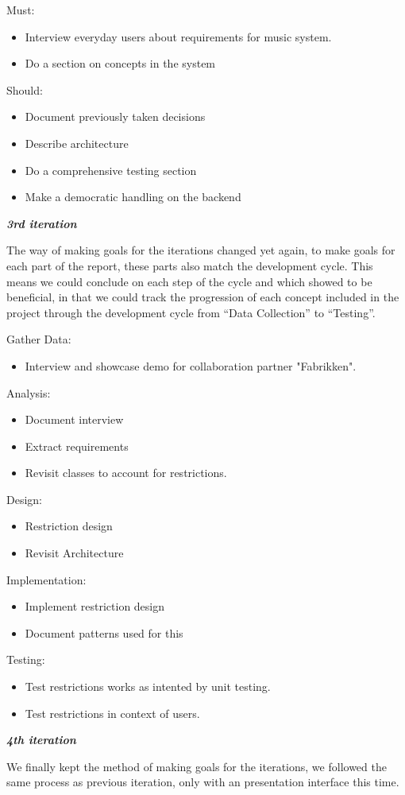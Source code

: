 	Must:
	\begin{itemize}
		\item Interview everyday users about requirements for music system.
		\item Do a section on concepts in the system
	\end{itemize}

	Should:
	\begin{itemize}
		\item Document previously taken decisions
		\item Describe architecture
		\item Do a comprehensive testing section
		\item Make a democratic handling on the backend
	\end{itemize}

  \noindent\textit{\textbf{3rd iteration}}

  The way of making goals for the iterations changed yet again, to make goals for each part of the report, these parts also match the development cycle. This means we could conclude on each step of the cycle and which showed to be beneficial, in that we could track the progression of each concept included in the project through the development cycle from \enquote{Data Collection} to \enquote{Testing}.

  Gather Data:
  \begin{itemize}
    \item Interview and showcase demo for collaboration partner "Fabrikken".
  \end{itemize}

  Analysis:
  \begin{itemize}
    \item Document interview
    \item Extract requirements
    \item Revisit classes to account for restrictions.
  \end{itemize}

  Design:
  \begin{itemize}
    \item Restriction design
    \item Revisit Architecture
  \end{itemize}

  Implementation:
  \begin{itemize}
    \item Implement restriction design
    \item Document patterns used for this
  \end{itemize}

  Testing:
  \begin{itemize}
    \item Test restrictions works as intented by unit testing.
    \item Test restrictions in context of users.
  \end{itemize}

  \noindent\textit{\textbf{4th iteration}}

  We finally kept the method of making goals for the iterations, we followed the same process as previous iteration, only with an presentation interface this time.
